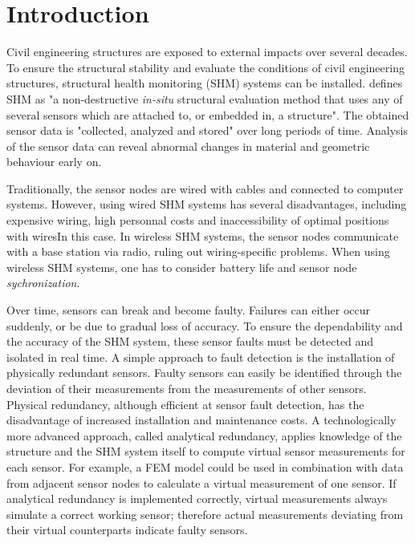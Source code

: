 \documentclass[12pt,a4paper]{scrartcl}
\begin{document}

\section*{Introduction}

Civil engineering structures are exposed to external impacts over several decades. 
To ensure the structural stability and evaluate the conditions of civil engineering structures, structural health monitoring (SHM) systems can be installed.
\cite[4]{BisbySHM} defines SHM as "a non-destructive \textit{in-situ} structural evaluation method that uses any of several sensors which are attached to, or embedded in, a structure". 
The obtained sensor data is "collected, analyzed and stored" over long periods of time.
Analysis of the sensor data can reveal abnormal changes in material and geometric behaviour early on.

Traditionally, the sensor nodes are wired with cables and connected to computer systems.
However, using wired SHM systems has several disadvantages, including expensive wiring, high personnal costs and inaccessibility of optimal positions with wiresIn this case.
In wireless SHM systems, the sensor nodes communicate with a base station via radio, ruling out wiring-specific problems.
When using wireless SHM systems, one has to consider battery life and sensor node \textit{sychronization}.

Over time, sensors can break and become faulty. Failures can either occur suddenly, or be due to gradual loss of accuracy.
To ensure the dependability and the accuracy of the SHM system, these sensor faults must be detected and isolated in real time. 
A simple approach to fault detection is the installation of physically redundant sensors.
Faulty sensors can easily be identified through the deviation of their measurements from the measurements of other sensors.
Physical redundancy, although efficient at sensor fault detection, has the disadvantage of increased installation and maintenance costs. 
A technologically more advanced approach, called analytical redundancy, applies knowledge of the structure and the SHM system itself to compute virtual sensor measurements for each sensor. 
For example, a FEM model could be used in combination with data from adjacent sensor nodes to calculate a virtual measurement of one sensor.
If analytical redundancy is implemented correctly, virtual measurements always simulate a correct working sensor; therefore actual measurements deviating from their virtual counterparts indicate faulty sensors.\citep{Smarsly2014}
\end{document}
